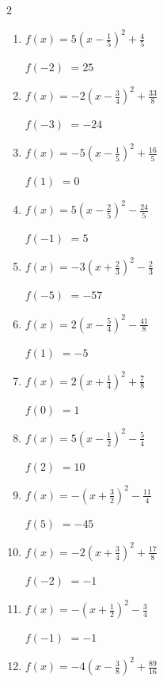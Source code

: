 \begin{multicols}{2}
\begin{enumerate}
  \item $\displaystyle f(x)=5\left( x-\frac{1}{5}\right)^{2}+\frac{4}{5}$

$f(-2)$
        $=25$

  \item $\displaystyle f(x)=-2\left( x-\frac{3}{4}\right)^{2}+\frac{33}{8}$

$f(-3)$
        $=-24$

  \item $\displaystyle f(x)=-5\left( x-\frac{1}{5}\right)^{2}+\frac{16}{5}$

$f(1)$
        $=0$

  \item $\displaystyle f(x)=5\left( x-\frac{2}{5}\right)^{2}-\frac{24}{5}$

$f(-1)$
        $=5$

\columnbreak %

\resetques

  \item $\displaystyle f(x)=-3\left( x+\frac{2}{3}\right)^{2}-\frac{2}{3}$

$f(-5)$
        $=-57$

  \item $\displaystyle f(x)=2\left( x-\frac{5}{4}\right)^{2}-\frac{41}{8}$

$f(1)$
        $=-5$

  \item $\displaystyle f(x)=2\left( x+\frac{1}{4}\right)^{2}+\frac{7}{8}$

$f(0)$
        $=1$

  \item $\displaystyle f(x)=5\left( x-\frac{1}{2}\right)^{2}-\frac{5}{4}$

$f(2)$
        $=10$

  \item $\displaystyle f(x)=-\left( x+\frac{3}{2}\right)^{2}-\frac{11}{4}$

$f(5)$
        $=-45$

\columnbreak %

  \item $\displaystyle f(x)=-2\left( x+\frac{3}{4}\right)^{2}+\frac{17}{8}$

$f(-2)$
        $=-1$

  \item $\displaystyle f(x)=-\left( x+\frac{1}{2}\right)^{2}-\frac{3}{4}$

$f(-1)$
        $=-1$

  \item $\displaystyle f(x)=-4\left( x-\frac{3}{8}\right)^{2}+\frac{89}{16}$


\end{enumerate}
\end{multicols}
